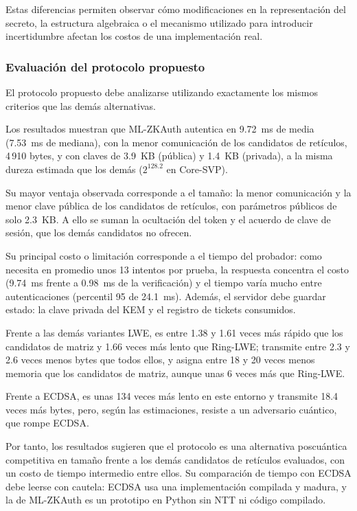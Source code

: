 Estas diferencias permiten observar cómo modificaciones en la representación del
secreto, la estructura algebraica o el mecanismo utilizado para introducir
incertidumbre afectan los costos de una implementación real.


\subsubsection{Evaluación del protocolo propuesto}
\label{subsec:proposed-evaluation}

El protocolo propuesto debe analizarse utilizando exactamente los mismos criterios que
las demás alternativas.

Los resultados muestran que
ML-ZKAuth autentica en 9.72~ms de media (7.53~ms de mediana), con la menor comunicación de los candidatos de retículos, 4\,910 bytes, y con claves de 3.9~KB (pública) y 1.4~KB (privada), a la misma dureza estimada que los demás ($2^{128.2}$ en Core-SVP).

Su mayor ventaja observada corresponde a
el tamaño: la menor comunicación y la menor clave pública de los candidatos de retículos, con parámetros públicos de solo 2.3~KB. A ello se suman la ocultación del token y el acuerdo de clave de sesión, que los demás candidatos no ofrecen.

Su principal costo o limitación corresponde a
el tiempo del probador: como necesita en promedio unos 13 intentos por prueba, la respuesta concentra el costo (9.74~ms frente a 0.98~ms de la verificación) y el tiempo varía mucho entre autenticaciones (percentil 95 de 24.1~ms). Además, el servidor debe guardar estado: la clave privada del KEM y el registro de tickets consumidos.

Frente a las demás variantes LWE,
es entre 1.38 y 1.61 veces más rápido que los candidatos de matriz y 1.66 veces más lento que Ring-LWE; transmite entre 2.3 y 2.6 veces menos bytes que todos ellos, y asigna entre 18 y 20 veces menos memoria que los candidatos de matriz, aunque unas 6 veces más que Ring-LWE.

Frente a ECDSA,
es unas 134 veces más lento en este entorno y transmite 18.4 veces más bytes, pero, según las estimaciones, resiste a un adversario cuántico, que rompe ECDSA.

Por tanto, los resultados sugieren que el protocolo
es una alternativa poscuántica competitiva en tamaño frente a los demás candidatos de retículos evaluados, con un costo de tiempo intermedio entre ellos. Su comparación de tiempo con ECDSA debe leerse con cautela: ECDSA usa una implementación compilada y madura, y la de ML-ZKAuth es un prototipo en Python sin NTT ni código compilado.


